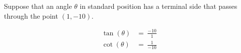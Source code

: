 Suppose that an angle $\theta$ in standard position has a terminal side that passes through the point $(1, -10)$.

$$
\begin{align*}
  \tan(\theta) &=\ \frac{-10}{1} \\
  \cot(\theta) &=\ \frac{1}{-10}
\end{align*}
$$
